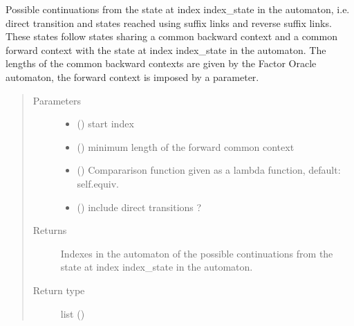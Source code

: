 \documentclass[letterpaper,10pt,english]{sphinxmanual}
\begin{document}
\begin{fulllineitems}
\begin{fulllineitems}
\label{\detokenize{index:Model.FactorOracle.continuations}}
Possible continuations from the state at index index\_state in the automaton, i.e. direct transition and states reached using suffix links and reverse suffix links.
These states follow states sharing a common backward context and a common forward context with the state at index index\_state in the automaton. 
The lengths of the common backward contexts are given by the Factor Oracle automaton, the forward context is imposed by a parameter.
\begin{quote}\begin{description}
\item[{Parameters}] \leavevmode\begin{itemize}
\item {} 
 () \textendash{} start index

\item {} 
 () \textendash{} minimum length of the forward common context

\item {} 
 () \textendash{} Compararison function given as a lambda function, default: self.equiv.

\item {} 
 () \textendash{} include direct transitions ?

\end{itemize}

\item[{Returns}] \leavevmode
Indexes in the automaton of the possible continuations from the state at index index\_state in the automaton.

\item[{Return type}] \leavevmode
list ()


\end{description}
\end{quote}
\end{fulllineitems}
\end{fulllineitems}
\end{document}
